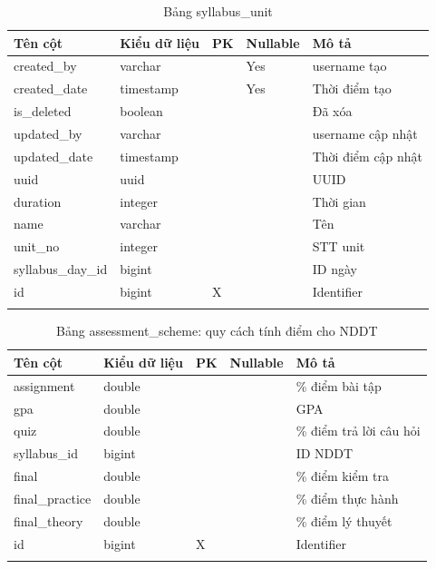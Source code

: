 \documentclass[report.tex]{subfiles}
\begin{document}
\begin{table}[!htb]
\begin{longtable}{|p{3cm}|p{3cm}|p{1cm}|p{1.6cm}|p{6cm}|}
\hline
\textbf{Tên cột} & \textbf{Kiểu dữ liệu} & \textbf{PK} & \textbf{Nullable} & \textbf{Mô tả} \\
\hline
created\_by & varchar & & Yes & username tạo \\
created\_date & timestamp & & Yes & Thời điểm tạo \\
is\_deleted & boolean & & & Đã xóa \\
updated\_by & varchar & & & username cập nhật \\
updated\_date & timestamp & & & Thời điểm cập nhật \\
uuid & uuid & & & UUID \\
duration & integer & & & Thời gian \\
name & varchar & & & Tên \\
unit\_no & integer & & & STT unit \\
syllabus\_day\_id & bigint & & & ID ngày \\
id & bigint & X & & Identifier \\
\hline
\caption[Bảng syllabus\_unit]{Bảng syllabus\_unit}
\end{longtable}
\end{table}
\FloatBarrier

\begin{table}[!htb]
\begin{longtable}{|p{3cm}|p{3cm}|p{1cm}|p{1.6cm}|p{6cm}|}
\hline
\textbf{Tên cột} & \textbf{Kiểu dữ liệu} & \textbf{PK} & \textbf{Nullable} & \textbf{Mô tả} \\
\hline
assignment & double & & & \% điểm bài tập \\
gpa & double & & & GPA \\
quiz & double & & & \% điểm trả lời câu hỏi \\
syllabus\_id & bigint & & & ID NDDT \\
final & double & & & \% điểm kiểm tra \\
final\_practice & double & & & \% điểm thực hành \\
final\_theory & double & & & \% điểm lý thuyết \\
id & bigint & X & & Identifier \\
\hline
\caption[Bảng assessment\_scheme]{Bảng assessment\_scheme: quy cách tính điểm cho NDDT}
\end{longtable}
\end{table}
\FloatBarrier
\end{document}
